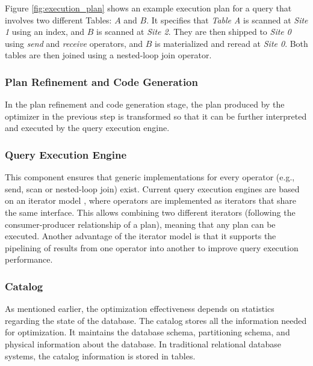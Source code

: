 Figure \ref{fig:execution_plan} shows an example execution plan for a query that involves two different Tables: $A$ and $B$. It specifies that \textit{Table A} is scanned at \textit{Site 1} using an index, and $B$ is scanned at \textit{Site 2}. They are then shipped to \textit{Site 0} using \textit{send} and \textit{receive} operators, and $B$ is materialized and reread at \textit{Site 0}. Both tables are then joined using a nested-loop join operator.

\subsubsection{Plan Refinement and Code Generation}

In the plan refinement and code generation stage, the plan produced by the optimizer in the previous step is transformed so that it can be further interpreted and executed by the query execution engine.

\subsubsection{Query Execution Engine}

This component ensures that generic implementations for every operator (e.g., send, scan or nested-loop join) exist. Current query execution engines are based on an iterator model \citep{Graefe1993b}, where operators are implemented as iterators that share the same interface. This allows combining two different iterators (following the consumer-producer relationship of a plan), meaning that any plan can be executed. Another advantage of the iterator model is that it supports the pipelining of results from one operator into another to improve query execution performance.

\subsubsection{Catalog}

As mentioned earlier, the optimization effectiveness depends on statistics regarding the state of the database. The catalog stores all the information needed for optimization. It maintains the database schema, partitioning schema, and physical information about the database. In traditional relational database systems, the catalog information is stored in tables. %

